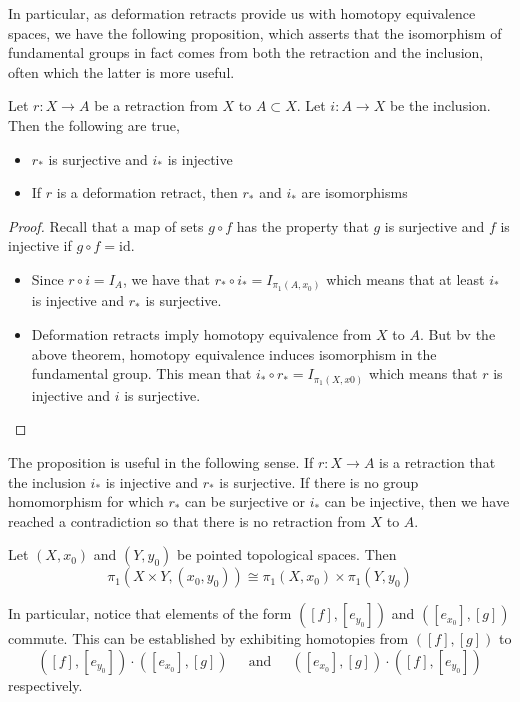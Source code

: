 \documentclass[a4paper]{article}
\begin{document}
In particular, as deformation retracts provide us with homotopy equivalence spaces, we have the following proposition, which asserts that the isomorphism of fundamental groups in fact comes from both the retraction and the inclusion, often which the latter is more useful. 

\begin{prp}{}{} Let $r:X\to A$ be a retraction from $X$ to $A\subset X$. Let $i:A\to X$ be the inclusion. Then the following are true, 
\begin{itemize}
\item $r_\ast$ is surjective and $i_\ast$ is injective
\item If $r$ is a deformation retract, then $r_\ast$ and $i_\ast$ are isomorphisms
\end{itemize} \tcbline
\begin{proof}
Recall that a map of sets $g\circ f$ has the property that $g$ is surjective and $f$ is injective if $g\circ f=\text{id}$. 
\begin{itemize}
\item Since $r\circ i=I_A$, we have that $r_\ast\circ i_\ast=I_{\pi_1(A,x_0)}$ which means that at least $i_\ast$ is injective and $r_\ast$ is surjective. 
\item Deformation retracts imply homotopy equivalence from $X$ to $A$. But bv the above theorem, homotopy equivalence induces isomorphism in the fundamental group. This mean that $i_\ast\circ r_\ast=I_{\pi_1(X,x0)}$ which means that $r$ is injective and $i$ is surjective. 
\end{itemize}
\end{proof}
\end{prp}

The proposition is useful in the following sense. If $r:X\to A$ is a retraction that the inclusion $i_\ast$ is injective and $r_\ast$ is surjective. If there is no group homomorphism for which $r_\ast$ can be surjective or $i_\ast$ can be injective, then we have reached a contradiction so that there is no retraction from $X$ to $A$.  

\begin{prp}{}{} Let $(X,x_0)$ and $(Y,y_0)$ be pointed topological spaces. Then $$\pi_1(X\times Y,(x_0,y_0))\cong\pi_1(X,x_0)\times\pi_1(Y,y_0)$$
\end{prp}

In particular, notice that elements of the form $([f],[e_{y_0}])$ and $([e_{x_0}],[g])$ commute. This can be established by exhibiting homotopies from $([f],[g])$ to $$([f],[e_{y_0}])\cdot([e_{x_0}],[g])\;\;\;\;\text{ and }\;\;\;\;([e_{x_0}],[g])\cdot([f],[e_{y_0}])$$ respectively. 
\end{document}
